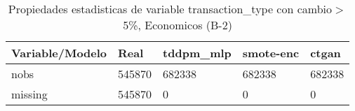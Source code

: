 \begin{table}[H]
\centering
\fontsize{8}{14}\selectfont
\caption{Propiedades estadisticas de variable transaction\_type con cambio\ensuremath{>}5\%, Economicos (B-2)}
\label{table-stats-economicos-b-2-transaction_type-short}
\begin{tabular}{|l|m{10em}|m{10em}|m{10em}|m{10em}|}
\hline
 \rowcolor[gray]{0.8}
Variable/Modelo & Real & tddpm\_mlp & smote-enc & ctgan \\
\hline nobs & 545870 & 682338 & 682338 & 682338 \\
\hline missing & 545870 & 0 & 0 & 0 \\
\hline
\end{tabular}
\end{table}
